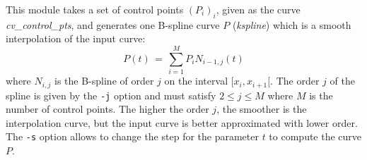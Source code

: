 This module takes a set of control points $(P_i)_i$, given as the curve
{\em cv\_control\_pts}, and
generates one B-spline curve $P$ ({\em kspline})
which is a smooth interpolation of the 
input curve:
\[
P(t) \, = \, \sum_{i=1}^{M} P_i N_{i-1,j}(t)
\]
where $N_{i,j}$ is the B-spline of order $j$ on the interval $[x_i,x_{i+1}[$.
The order $j$ of the spline is given by the \verb+-j+ option and must satisfy
$2 \leq j \leq M$ where $M$ is the number of control points.
The higher the order $j$, the smoother is the interpolation curve, but the 
input curve is better approximated with lower order.
The \verb+-s+ option allows to change the step for the parameter $t$ to compute
the curve $P$.

